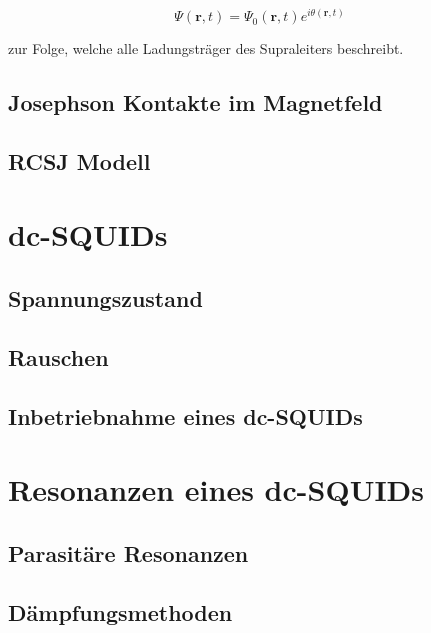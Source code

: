 \begin{equation}
\Psi(\textbf{r},t) = \Psi_0(\textbf{r},t)e^{i\theta(\textbf{r},t)}
\end{equation}

zur Folge, welche alle Ladungsträger des Supraleiters beschreibt.
\subsection{Josephson Kontakte im Magnetfeld}

\Blindtext

\subsection{RCSJ Modell}

\section{dc-SQUIDs}

\blindtext[3]

\subsection{Spannungszustand}

\subsection{Rauschen}

\subsection{Inbetriebnahme eines dc-SQUIDs}


\section{Resonanzen eines dc-SQUIDs}

\subsection{Parasitäre Resonanzen}

\subsection{Dämpfungsmethoden}


